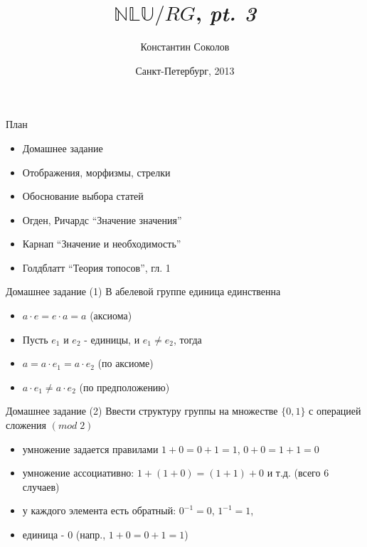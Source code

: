 \documentclass{beamer}
\begin{document}
\title{\huge{$\mathbb{NLU}/RG$, \textit{pt. 3}}}
\author{Константин Соколов}
\date{Санкт-Петербург, 2013} 
\begin{frame}
    \thispagestyle{empty}
    \titlepage
\end{frame}

\begin{frame}{План}
    \setcounter{framenumber}{1}
    \begin{itemize}
        \item Домашнее задание
        \item Отображения, морфизмы, стрелки
        \item Обоснование выбора статей
        \item Огден, Ричардс ``Значение значения''
        \item Карнап ``Значение и необходимость''
        \item Голдблатт ``Теория топосов'', гл. 1
    \end{itemize}
\end{frame}

\begin{frame}{Домашнее задание (1)}
В абелевой группе единица единственна\\
  \begin{itemize}
    \item $a \cdot e  = e \cdot a = a$ (аксиома)
    \item Пусть $e_1$ и $e_2$ - единицы, и $e_1 \neq e_2$, тогда 
    \item $a = a \cdot e_1 = a \cdot e_2$ (по аксиоме)
    \item $a \cdot e_1 \neq a \cdot e_2$ (по предположению)
  \end{itemize}  
\end{frame}

\begin{frame}{Домашнее задание (2)}
Ввести структуру группы на множестве $\{0, 1\}$ с операцией сложения $(mod \; 2)$\\
  \begin{itemize}
    \item умножение задается правилами $1 + 0 = 0 + 1 = 1$, $0 + 0 = 1 + 1 = 0$
    \item умножение ассоциативно: $1 + (1 + 0) = (1 + 1) + 0$ и т.д. (всего 6 случаев)
    \item у каждого элемента есть обратный: $0^{-1} = 0$, $1^{-1} = 1$, 
    \item единица - $0$ (напр., $1 + 0 = 0 + 1 = 1$) 
  \end{itemize}  
\end{frame}
\end{document}
